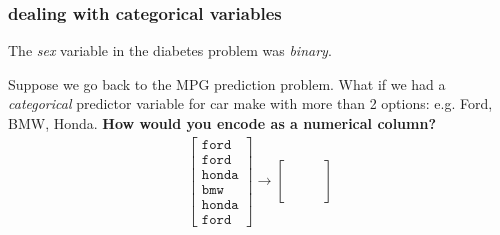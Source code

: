\documentclass[handout,compress]{beamer}
\begin{document}
\begin{frame}
	\frametitle{dealing with categorical variables}
	The \emph{sex} variable in the diabetes problem was \emph{binary}.
	
	Suppose we go back to the MPG prediction problem. What if we had a \emph{categorical} predictor variable for car make with more than 2 options: e.g. Ford, BMW, Honda. \textbf{How would you encode as a numerical column?}
	\begin{align*}
	\begin{bmatrix}
	\texttt{ford} \\\texttt{ford} \\ \texttt{honda} \\ \texttt{bmw} \\ \texttt{honda} \\ \texttt{ford}
	\end{bmatrix} \rightarrow 
	\begin{bmatrix}
	\hspace{2em} \\\hspace{2em} \\ \hspace{2em} \\ \hspace{2em} \\ \hspace{2em} \\ \hspace{2em}
	\end{bmatrix}
	\end{align*}
\end{frame}
\end{document}
